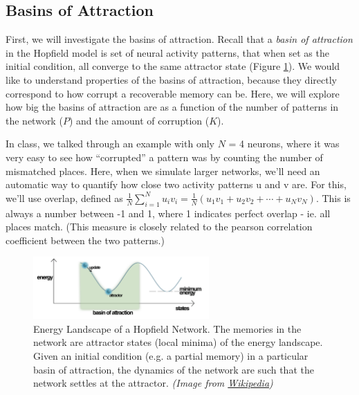 \documentclass[letterpaper,11pt]{article}
\begin{document}
\subsection{Basins of Attraction}
First, we will investigate the basins of attraction. Recall that a \textit{basin of attraction} in the Hopfield model is set of neural activity patterns, that when set as the initial condition, all converge to the same attractor state (Figure \ref{fig:energy}). We would like to understand properties of the basins of attraction, because they directly correspond to how corrupt a recoverable memory can be. Here, we will explore how big the basins of attraction are as a function of the number of patterns in the network ($P$) and the amount of corruption ($K$).

In class, we talked through an example with only $N$ = 4 neurons, where it was very easy to
see how ``corrupted'' a pattern was by counting the number of mismatched places. Here, when we
simulate larger networks, we'll need an automatic way to quantify how close two activity patterns u
and v are. For this, we'll use overlap, defined as $\frac{1}{N} \sum_{i=1}^N u_i v_i = \frac{1}{N} (u_1 v_1 + u_2 v_2 + \cdots + u_N v_N)$. This is always a number between -1 and 1, where 1 indicates perfect overlap - ie. all places match. (This measure is closely related to the pearson correlation coefficient between the two patterns.)

\begin{figure}[h!]
  \begin{center}
    \includegraphics[width=0.6\textwidth]{energy.png}
    \caption{Energy Landscape of a Hopfield Network. The memories in the network are attractor states (local minima) of the energy landscape. Given an initial condition (e.g. a partial memory) in a particular basin of attraction, the dynamics of the network are such that the network settles at the attractor. \textit{(Image from \href{http://www.wikiwand.com/en/Hopfield\_network}{Wikipedia})}}
    \label{fig:energy}
  \end{center}
\end{figure}
\end{document}
